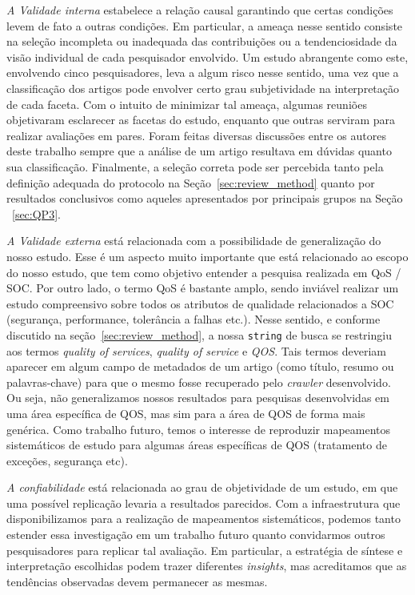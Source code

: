 \emph{A Validade interna} estabelece a rela\c{c}\~{a}o causal garantindo que certas condi\c{c}\~{o}es levem de fato a outras condi\c{c}\~{o}es. Em particular, a ameaça nesse sentido consiste na seleção incompleta ou inadequada das contribuições ou a tendenciosidade da visão individual de cada pesquisador envolvido. Um estudo abrangente como este, envolvendo cinco pesquisadores, leva a algum risco nesse sentido, uma vez que a classifica\c c\~{a}o dos artigos pode envolver certo grau subjetividade na interpreta\c{c}\~{a}o de cada faceta. Com o intuito de minimizar tal amea\c{c}a, algumas reuni\~{o}es objetivaram esclarecer as facetas do estudo, enquanto que outras serviram para realizar avalia\c c\~{o}es em pares. Foram feitas diversas discuss\~{o}es entre os autores deste trabalho sempre que a an\'{a}lise de um artigo resultava em d\'{u}vidas quanto sua classifica\c c\~{a}o. Finalmente, a seleção correta pode ser percebida tanto pela definição adequada do protocolo na Seção~\ref{sec:review_method} quanto por resultados conclusivos como aqueles apresentados por principais grupos na Se\c{c}\~{a}o ~\ref{sec:QP3}.

\emph{A Validade externa} est\'{a} relacionada com a possibilidade de
generaliza\c c\~{a}o do nosso estudo. Esse \'{e} um aspecto muito
importante que est\'{a} relacionado ao escopo do nosso estudo, que tem
como objetivo entender a pesquisa realizada em QoS / SOC. Por outro
lado, o termo QoS \'{e} bastante amplo, sendo invi\'{a}vel realizar
um estudo compreensivo sobre todos os atributos de qualidade
relacionados a SOC (seguran\c ca, performance, toler\^{a}ncia a falhas
etc.). Nesse sentido, e conforme discutido na se\c{c}\~{a}o~\ref{sec:review_method}, a nossa \texttt{string} de busca se restringiu aos termos \emph{quality of services}, \emph{quality of service} e \emph{QOS}. Tais termos deveriam aparecer em algum campo de metadados de um artigo (como t\'{i}tulo, resumo ou palavras-chave) para que o mesmo fosse recuperado pelo \emph{crawler} desenvolvido. Ou seja, n\~{a}o generalizamos nossos resultados para pesquisas desenvolvidas em uma \'{a}rea espec\'{i}fica de QOS, mas sim para a \'{a}rea de QOS de forma mais gen\'{e}rica. Como
trabalho futuro, temos o interesse de reproduzir mapeamentos sistem\'{a}ticos de estudo para algumas \'{a}reas espec\'{i}ficas de QOS (tratamento de exce\c
c\~{o}es, seguran\c ca etc). 

\emph{A confiabilidade} est\'{a} relacionada ao grau de objetividade de
um estudo, em que uma poss\'{i}vel replica\c c\~{a}o levaria a
resultados parecidos. Com a infraestrutura que disponibilizamos para a realiza\c{c}\~{a}o de mapeamentos sistem\'{a}ticos, podemos tanto estender essa investiga\c c\~{a}o em um trabalho futuro quanto convidarmos outros pesquisadores para replicar tal avalia\c c\~{a}o. Em particular, a estrat\'{e}gia de s\'{i}ntese e interpreta\c{c}\~{a}o escolhidas podem trazer diferentes \emph{insights}, mas acreditamos que as tend\^{e}ncias observadas devem permanecer as mesmas.